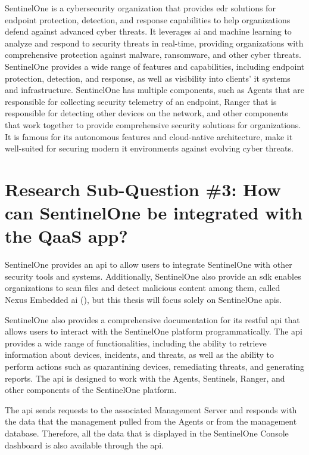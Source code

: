 \begin{multicols}{2}
      SentinelOne is a cybersecurity organization that provides \acrshort{edr} solutions for endpoint protection, detection, and response
      capabilities to help organizations defend against advanced cyber threats. It leverages \acrshort{ai} and machine learning to
      analyze and respond to security threats in real-time, providing organizations with comprehensive protection against
      malware, ransomware, and other cyber threats. SentinelOne provides a wide range of features and capabilities, including
      endpoint protection, detection, and response, as well as visibility into clients' \acrshort{it} systems and infrastructure.
      SentinelOne has multiple components, such as Agents that are responsible for collecting security telemetry of an endpoint,
      Ranger that is responsible for detecting other devices on the network, and other components that work together to provide
      comprehensive security solutions for organizations. It is famous for its autonomous features and cloud-native architecture,
      make it well-suited for securing modern \acrshort{it} environments against evolving cyber threats.


      \section{Research Sub-Question \#3: How can SentinelOne be integrated with the QaaS app?}

      SentinelOne provides an \acrshort{api} to allow users to integrate SentinelOne with other security tools and systems. Additionally,
      SentinelOne also provide an \acrshort{sdk} enables organizations to scan files and detect malicious content among them, called
      Nexus Embedded \acrshort{ai} (\textit{\cite{nexusSDK}}), but this thesis will focus solely on SentinelOne \acrshort{api}s.

      SentinelOne also provides a comprehensive documentation for its \acrshort{rest}ful \acrshort{api} that allows users to interact
      with the SentinelOne platform programmatically. The \acrshort{api} provides a wide range of functionalities, including the ability
      to retrieve information about devices, incidents, and threats, as well as the ability to perform actions such as quarantining devices,
      remediating threats, and generating reports. The \acrshort{api} is designed to work with the Agents, Sentinels, Ranger, and other
      components of the SentinelOne platform.

      The \acrshort{api} sends requests to the associated Management Server and responds with the data that the management pulled from
      the Agents or from the management database. Therefore, all the data that is displayed in the SentinelOne Console dashboard is also
      available through the \acrshort{api}.


\end{multicols}

